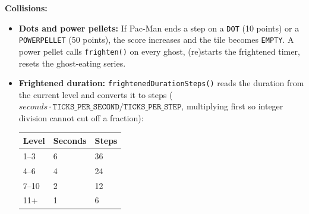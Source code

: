 \documentclass[11pt, a4paper]{article}
\begin{document}
\textbf{Collisions:}
\begin{itemize}
    \item \textbf{Dots and power pellets:} If Pac-Man ends a step on a \texttt{DOT} (10 points) or a \texttt{POWERPELLET} (50 points), the score increases and the tile becomes \texttt{EMPTY}. A power pellet calls \texttt{frighten()} on every ghost, (re)starts the frightened timer, resets the ghost-eating series.
    \item \textbf{Frightened duration:} \texttt{frightenedDurationSteps()} reads the duration from the current level and converts it to steps ($\textit{seconds} \cdot \texttt{TICKS\_PER\_SECOND} / \texttt{TICKS\_PER\_STEP}$, multiplying first so integer division cannot cut off a fraction):

    \vspace{0.1cm}
    \begin{tabular}{@{}lll@{}}
        \toprule
        \textbf{Level} & \textbf{Seconds} & \textbf{Steps} \\
        \midrule
        1--3 & 6 & 36 \\
        4--6 & 4 & 24 \\
        7--10 & 2 & 12 \\
        11+ & 1 & 6 \\
        \bottomrule
    \end{tabular}
    \vspace{0.1cm}


\end{itemize}
\end{document}
